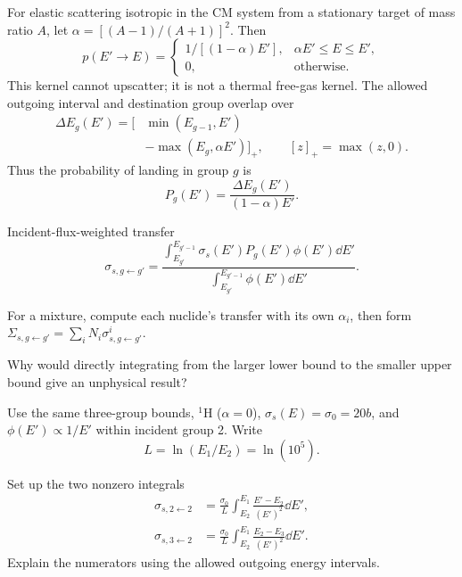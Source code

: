 \newpage
\begin{handoutcolumns}
For elastic scattering isotropic in the CM system from a
stationary target of mass ratio $A$, let
$\alpha=[(A-1)/(A+1)]^2$. Then
\[
 p(E'\!\to E)=
 \begin{cases}
  1/[(1-\alpha)E'],&\alpha E'\le E\le E',\\
  0,&\text{otherwise}.
 \end{cases}
\]
This kernel cannot upscatter; it is not a thermal free-gas kernel.
The allowed outgoing interval and destination group overlap over
\begin{align*}
 \Delta E_g(E')=\Big[&\min(E_{g-1},E')\\
                  &-\max(E_g,\alpha E')\Big]_+,
 \qquad [z]_+=\max(z,0).
\end{align*}
Thus the probability of landing in group $g$ is
\[
 P_g(E')=\frac{\Delta E_g(E')}{(1-\alpha)E'}.
\]
\begin{fixedbox}{Incident-flux-weighted transfer}
\[
 \boxed{\sigma_{s,g\gets g'}=
 \frac{\displaystyle\int_{E_{g'}}^{E_{g'-1}}
      \sigma_s(E')P_g(E')\phi(E')\dd E'}
      {\displaystyle\int_{E_{g'}}^{E_{g'-1}}\phi(E')\dd E'}}.
\]
\end{fixedbox}
For a mixture, compute each nuclide's transfer with its own
$\alpha_i$, then form $\Sigma_{s,g\gets g'}=\sum_iN_i\sigma^i_{s,g\gets g'}$.
\begin{checkpoint}
Why would directly integrating from the larger lower bound to
the smaller upper bound give an unphysical result?
\end{checkpoint}

Use the same three-group bounds, ${}^1$H ($\alpha=0$),
$\sigma_s(E)=\sigma_0=20\unit{b}$, and $\phi(E')\propto1/E'$
within incident group 2. Write
\[
 L=\ln(E_1/E_2)=\ln(10^5).
\]
\begin{boardbox}{Set up the two nonzero integrals}
\begin{align*}
 \sigma_{s,2\gets2}
 &=\frac{\sigma_0}{L}\int_{E_2}^{E_1}
                   \frac{E'-E_2}{(E')^2}\dd E',\\
 \sigma_{s,3\gets2}
 &=\frac{\sigma_0}{L}\int_{E_2}^{E_1}
                   \frac{E_2-E_3}{(E')^2}\dd E'.
\end{align*}
Explain the numerators using the allowed outgoing energy intervals.
\end{boardbox}


\end{handoutcolumns}
